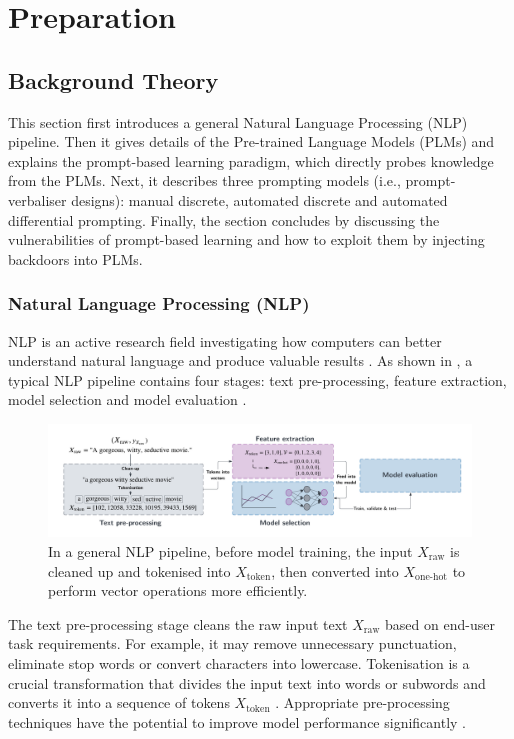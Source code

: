 \chapter{Preparation}
\section{Background Theory}
This section first introduces a general Natural Language Processing (NLP) pipeline. Then it gives details of the Pre-trained Language Models (PLMs) and explains the prompt-based learning paradigm, which directly probes knowledge from the PLMs. Next, it describes three prompting models (i.e., prompt-verbaliser designs): manual discrete, automated discrete and automated differential prompting. Finally, the section concludes by discussing the vulnerabilities of prompt-based learning and how to exploit them by injecting backdoors into PLMs.

\subsection{Natural Language Processing (NLP)}
NLP is an active research field investigating how computers can better understand natural language and produce valuable results \cite{chowdhary20nlp}. As shown in , a typical NLP pipeline contains four stages: text pre-processing, feature extraction, model selection and model evaluation \cite{Vajjala20nlp}.

\begin{figure}[!ht]
    \centering
    \includegraphics[width=\hsize]{figures/preparation_media/prepare-pipeline.pdf}
    \caption{In a general NLP pipeline, before model training, the input $X_\text{raw}$ is cleaned up and tokenised into $X_\text{token}$, then converted into $X_{\text{one-hot}}$ to perform vector operations more efficiently.}
    \label{fig:prepare-pipeline}
\end{figure}

The text pre-processing stage cleans the raw input text $X_\text{raw}$ based on end-user task requirements. For example, it may remove unnecessary punctuation, eliminate stop words or convert characters into lowercase. Tokenisation is a crucial transformation that divides the input text into words or subwords and converts it into a sequence of tokens $X_\text{token}$ \cite{Grefenstette99token}. Appropriate pre-processing techniques have the potential to improve model performance significantly \cite{Haddi13textpreprocess}. 

